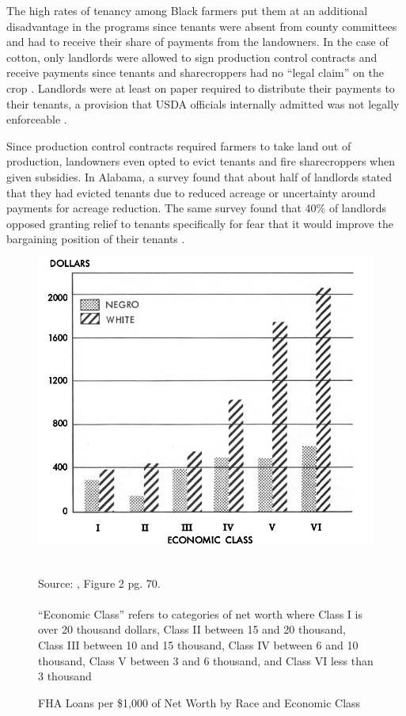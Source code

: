 \documentclass[12pt]{article}
\begin{document}
The high rates of tenancy among Black farmers put them at an additional disadvantage in the programs since tenants were absent from county committees and had to receive their share of payments from the landowners.
In the case of cotton, only landlords were allowed to sign production control contracts and receive payments since tenants and sharecroppers had no “legal claim” on the crop \citep[pg. 52]{conrad_forgotten_1965}. 
Landlords were at least on paper required to distribute their payments to their tenants, a provision that USDA officials internally admitted was not legally enforceable \citep[pg. 58]{conrad_forgotten_1965}. 

Since production control contracts required farmers to take land out of production, landowners even opted to evict tenants and fire sharecroppers when given subsidies. 
In Alabama, a survey found that about half of landlords stated that they had evicted tenants due to reduced acreage or uncertainty around payments for acreage reduction.
The same survey found that 40\% of landlords opposed granting relief to tenants specifically for fear that it would improve the bargaining position of their tenants \citep{conrad_forgotten_1965}. 

\begin{figure}[ht!]
    \centering
    \caption{FHA Loans per \$1,000 of Net Worth by Race and Economic Class}
    \label{fhaloans}
    \includegraphics[width=.75\textwidth]{figs/Figure4.png}
   \begin{minipage}{.8\textwidth}
    \centering
    \quad \\
    Source: \citet{us_commission_on_civil_rights_equal_1965}, Figure 2 pg. 70. 
    \quad \\
    \quad \\
    ``Economic Class'' refers to categories of net worth where Class I is over 20 thousand dollars, Class II between 15 and 20 thousand, Class III between 10 and 15 thousand, Class IV between 6 and 10 thousand, Class V between 3 and 6 thousand, and Class VI less than 3 thousand
    \end{minipage}
\end{figure}
\end{document}
